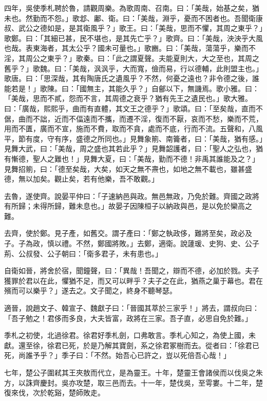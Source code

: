 \begin{pinyinscope}
四年，吳使季札聘於魯，請觀周樂。為歌周南、召南。曰：「美哉，始基之矣，猶未也。然勤而不怨。」歌邶、鄘、衛。曰：「美哉，淵乎，憂而不困者也。吾聞衛康叔、武公之德如是，是其衛風乎？」歌王。曰：「美哉，思而不懼，其周之東乎？」歌鄭。曰：「其細已甚，民不堪也，是其先亡乎？」歌齊。曰：「美哉，泱泱乎大風也哉。表東海者，其太公乎？國未可量也。」歌豳。曰：「美哉，蕩蕩乎，樂而不淫，其周公之東乎？」歌秦。曰：「此之謂夏聲。夫能夏則大，大之至也，其周之舊乎？」歌魏。曰：「美哉，沨沨乎，大而寬，儉而易，行以德輔，此則盟主也。」歌唐。曰：「思深哉，其有陶唐氏之遺風乎？不然，何憂之遠也？非令德之後，誰能若是！」歌陳。曰：「國無主，其能久乎？」自鄶以下，無譏焉。歌小雅。曰：「美哉，思而不貳，怨而不言，其周德之衰乎？猶有先王之遺民也。」歌大雅。曰：「廣哉，熙熙乎，曲而有直體，其文王之德乎？」歌頌。曰：「至矣哉，直而不倨，曲而不詘，近而不偪遠而不攜，而遷不淫，復而不厭，哀而不愁，樂而不荒，用而不匱，廣而不宣，施而不費，取而不貪，處而不底，行而不流。五聲和，八風平，節有度，守有序，盛德之所同也。」見舞象箾、南籥者，曰：「美哉，猶有感。」見舞大武，曰：「美哉，周之盛也其若此乎？」見舞韶護者，曰：「聖人之弘也，猶有慚德，聖人之難也！」見舞大夏，曰：「美哉，勤而不德！非禹其誰能及之？」見舞招箾，曰：「德至矣哉，大矣，如天之無不燾也，如地之無不載也，雖甚盛德，無以加矣。觀止矣，若有他樂，吾不敢觀。」

去魯，遂使齊。說晏平仲曰：「子速納邑與政。無邑無政，乃免於難。齊國之政將有所歸；未得所歸，難未息也。」故晏子因陳桓子以納政與邑，是以免於欒高之難。

去齊，使於鄭。見子產，如舊交。謂子產曰：「鄭之執政侈，難將至矣，政必及子。子為政，慎以禮。不然，鄭國將敗。」去鄭，適衛。說蘧瑗、史狗、史、公子荊、公叔發、公子朝曰：「衛多君子，未有患也。」

自衛如晉，將舍於宿，聞鐘聲，曰：「異哉！吾聞之，辯而不德，必加於戮。夫子獲罪於君以在此，懼猶不足，而又可以畔乎？夫子之在此，猶燕之巢于幕也。君在殯而可以樂乎？」遂去之。文子聞之，終身不聽琴瑟。

適晉，說趙文子、韓宣子、魏獻子曰：「晉國其萃於三家乎！」將去，謂叔向曰：「吾子勉之！君侈而多良，大夫皆富，政將在三家。吾子直，必思自免於難。」

季札之初使，北過徐君。徐君好季札劍，口弗敢言。季札心知之，為使上國，未獻。還至徐，徐君已死，於是乃解其寶劍，系之徐君冢樹而去。從者曰：「徐君已死，尚誰予乎？」季子曰：「不然。始吾心已許之，豈以死倍吾心哉！」

七年，楚公子圍弒其王夾敖而代立，是為靈王。十年，楚靈王會諸侯而以伐吳之朱方，以誅齊慶封。吳亦攻楚，取三邑而去。十一年，楚伐吳，至雩婁。十二年，楚復來伐，次於乾谿，楚師敗走。


\end{pinyinscope}
